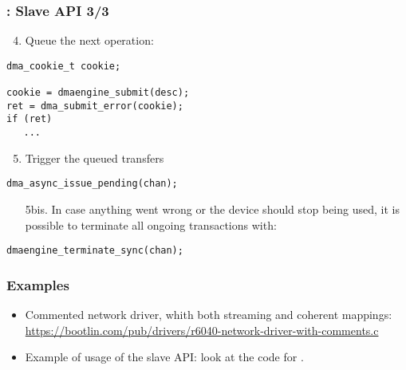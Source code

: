 \begin{frame}[fragile]
  \frametitle{: Slave API 3/3}
  \begin{enumerate}
    \setcounter{enumi}{3}
  \item Queue the next operation:
  \end{enumerate}
  \begin{verbatim}
dma_cookie_t cookie;

cookie = dmaengine_submit(desc);
ret = dma_submit_error(cookie);
if (ret)
   ...
\end{verbatim}
  \begin{enumerate}
    \setcounter{enumi}{4}
  \item Trigger the queued transfers
  \end{enumerate}
  \begin{verbatim}
dma_async_issue_pending(chan);
\end{verbatim}
  \begin{enumerate}
  \item[5bis.] In case anything went wrong or the device should stop being
    used, it is possible to terminate all ongoing transactions with:
  \end{enumerate}
  \begin{verbatim}
dmaengine_terminate_sync(chan);
\end{verbatim}
\end{frame}

\begin{frame}
  \frametitle{Examples}
  \begin{itemize}
  \item Commented network driver, whith both streaming and coherent
    mappings:\\
    \small \url{https://bootlin.com/pub/drivers/r6040-network-driver-with-comments.c}
  \item Example of usage of the slave API: look at the code for
    .
  \end{itemize}
\end{frame}
